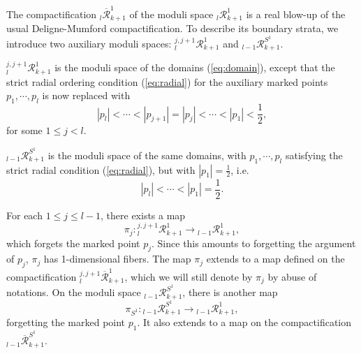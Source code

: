 \documentclass[a4paper]{article}
\numberwithin{equation}{section}
\begin{document}
The compactification ${}_l\overline{\mathcal{R}}_{k+1}^1$ of the moduli space ${}_l\mathcal{R}_{k+1}^1$ is a real blow-up of the usual Deligne-Mumford compactification. To describe its boundary strata, we introduce two auxiliary moduli spaces: ${}_l^{j,j+1}\mathcal{R}_{k+1}^1$ and ${}_{l-1}\mathcal{R}_{k+1}^{S^1}$.

${}_l^{j,j+1}\mathcal{R}_{k+1}^1$ is the moduli space of the domains (\ref{eq:domain}), except that the strict radial ordering condition (\ref{eq:radial}) for the auxiliary marked points $p_1,\cdots,p_l$ is now replaced with
\begin{equation}
|p_l|<\cdots<|p_{j+1}|=|p_j|<\cdots<|p_1|<\frac{1}{2}, 
\end{equation}
for some $1\leq j<l$. 

${}_{l-1}\mathcal{R}_{k+1}^{S^1}$ is the moduli space of the same domains, with $p_1,\cdots,p_l$ satisfying the strict radial condition (\ref{eq:radial}), but with $|p_1|=\frac{1}{2}$, i.e.
\begin{equation}
|p_l|<\cdots<|p_1|=\frac{1}{2}.
\end{equation}

For each $1\leq j\leq l-1$, there exists a map
\begin{equation}\label{eq:fj}
\pi_j:{}_l^{j,j+1}\mathcal{R}_{k+1}^1\rightarrow{}_{l-1}\mathcal{R}_{k+1}^1,
\end{equation}
which forgets the marked point $p_j$. Since this amounts to forgetting the argument of $p_j$, $\pi_j$ has 1-dimensional fibers. The map $\pi_j$ extends to a map defined on the compactification ${}_l^{j,j+1}\overline{\mathcal{R}}_{k+1}^1$, which we will still denote by $\pi_j$ by abuse of notations. On the moduli space ${}_{l-1}\mathcal{R}_{k+1}^{S^1}$, there is another map
\begin{equation}\label{eq:f-S1}
\pi_{S^1}:{}_{l-1}\mathcal{R}_{k+1}^{S^1}\rightarrow{}_{l-1}\mathcal{R}_{k+1}^1,
\end{equation}
forgetting the marked point $p_1$. It also extends to a map on the compactification ${}_{l-1}\overline{\mathcal{R}}_{k+1}^{S^1}$.
\end{document}
